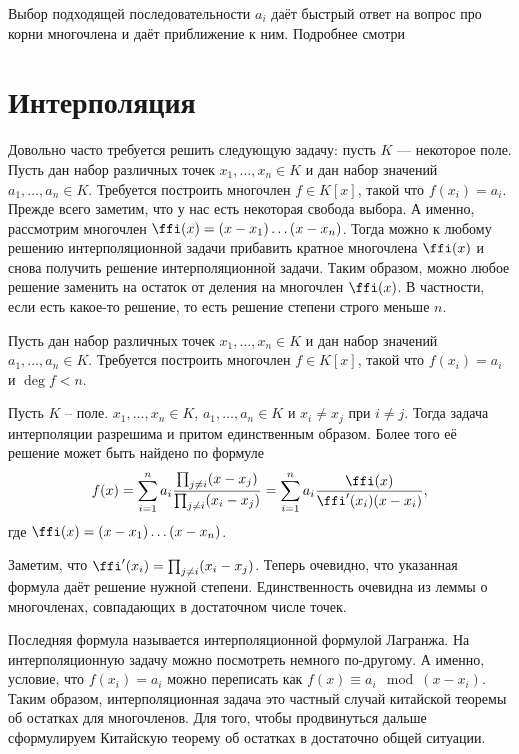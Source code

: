 Выбор подходящей последовательности $a_i$ даёт быстрый ответ на вопрос про корни многочлена и даёт приближение к ним. Подробнее смотри \cite[стр 56-61]{McNamee}







\section{Интерполяция}

Довольно часто требуется решить следующую задачу: пусть $K$ --- некоторое поле. Пусть дан набор различных точек
$x_1,\dots, x_n \in K$ и дан набор значений $a_1,\dots,a_n\in K$. Требуется построить многочлен $f\in K[x]$, такой что $f(x_i)=a_i$.
Прежде всего заметим, что у нас есть некоторая свобода выбора. А именно, рассмотрим многочлен $\ffi(x)=(x-x_1)\dots(x-x_n)$. Тогда можно к любому решению интерполяционной задачи прибавить кратное многочлена $\ffi(x)$ и снова получить решение интерполяционной задачи. Таким образом, можно любое решение заменить на остаток от деления на многочлен $\ffi(x)$. В частности, если есть какое-то решение, то есть решение степени строго меньше $n$.

 Пусть дан набор различных точек $x_1,\dots,x_n\in K$ и дан набор значений
$a_1,\dots, a_n\in K$. Требуется построить многочлен $f\in K[x]$, такой что $f(x_i)=a_i$ и $\deg f < n$.
\edfn

\thrm Пусть $K$ -- поле. $x_1,\dots,x_n \in K$, $a_1,\dots,a_n \in K$ и $x_i\neq x_j$ при $i\neq j$. Тогда задача интерполяции разрешима и притом единственным образом. Более того её решение может быть найдено по формуле
$$f(x)=\sum_{i=1}^n a_i\frac{\prod_{j\neq i}(x-x_j)}{\prod_{j\neq i } (x_i-x_j)}=\sum_{i=1}^n a_i\frac{\ffi(x)}{\ffi'(x_i)(x-x_i)},$$
где $\ffi(x)=(x-x_1)\dots(x-x_n)$.
\ethrm

\proof Заметим, что $\ffi'(x_i)=\prod_{j\neq i}(x_i-x_j)$. Теперь очевидно, что указанная формула даёт решение нужной степени. Единственность очевидна из леммы о многочленах, совпадающих в достаточном числе точек.
\endproof

Последняя формула называется интерполяционной формулой Лагранжа. На интерполяционную задачу можно посмотреть немного по-другому. А именно, условие, что $f(x_i)=a_i$ можно переписать как $f(x)\equiv a_i \mod (x-x_i)$. Таким образом, интерполяционная задача это частный случай китайской теоремы об остатках для многочленов. Для того, чтобы продвинуться дальше сформулируем Китайскую теорему об остатках в достаточно общей ситуации. 


